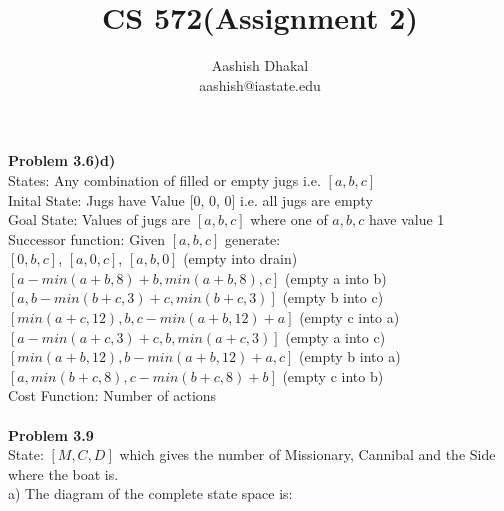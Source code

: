 \documentclass[11pt]{article}
\begin{document}
\title{CS 572(Assignment 2)} %
\author{Aashish Dhakal\\ %
aashish@iastate.edu\\%
 }      %
\date{}


\maketitle
\section*{}

\textbf{Problem 3.6)d)}
\\ States: Any combination of filled or empty jugs i.e. $[a, b, c]$\\
Inital State: Jugs have Value [0, 0, 0] i.e. all jugs are empty \\
Goal State: Values of jugs are $[a, b, c]$ where one of $a, b, c$ have value 1\\
Successor function: Given $[a, b, c]$ generate:\\
$[0, b, c]$, $[a, 0, c]$, $[a, b, 0]$  (empty into drain)\\
$[a-min(a+b,8)+b, min(a+b,8), c]$ (empty a into b)\\
$[a, b-min(b+c,3)+c, min(b+c,3)]$ (empty b into c)\\
$[min(a+c,12), b, c-min(a+b,12)+a]$ (empty c into a)\\
$[a-min(a+c,3)+c, b, min(a+c,3)]$ (empty a into c)\\
$[min(a+b,12), b-min(a+b,12)+a, c]$ (empty b into a)\\
$[a, min(b+c,8), c-min(b+c,8)+b]$ (empty c into b)\\
Cost Function: Number of actions \\ \\
\textbf{Problem 3.9}
\\ State: $[M, C, D]$ which gives the number of Missionary, Cannibal and the Side where the boat is.\\
a) The diagram of the complete state space is: \\
\end{document}
